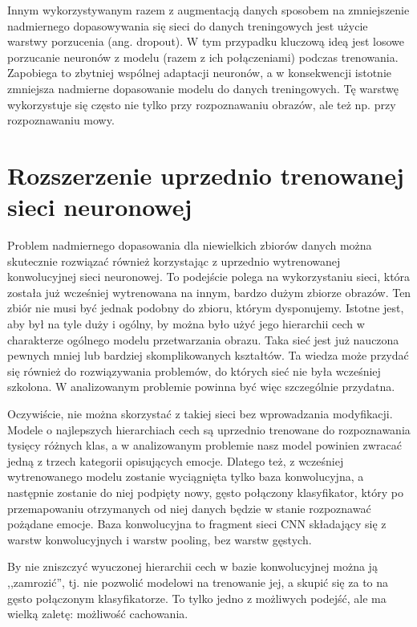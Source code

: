 Innym wykorzystywanym razem z augmentacją danych sposobem na zmniejszenie nadmiernego dopasowywania się sieci do danych treningowych jest użycie warstwy porzucenia (ang. dropout). W tym przypadku kluczową ideą jest losowe porzucanie neuronów z modelu (razem z ich połączeniami) podczas trenowania. Zapobiega to zbytniej wspólnej adaptacji neuronów, a w konsekwencji istotnie zmniejsza nadmierne dopasowanie modelu do danych treningowych. Tę warstwę wykorzystuje się często nie tylko przy rozpoznawaniu obrazów, ale też np. przy rozpoznawaniu mowy.


\section{Rozszerzenie uprzednio trenowanej sieci neuronowej}
Problem nadmiernego dopasowania dla niewielkich zbiorów danych można skutecznie rozwiązać również korzystając z uprzednio wytrenowanej konwolucyjnej sieci neuronowej. To podejście polega na wykorzystaniu sieci, która została już wcześniej wytrenowana na innym, bardzo dużym zbiorze obrazów. Ten zbiór nie musi być jednak podobny do zbioru, którym dysponujemy. Istotne jest, aby był na tyle duży i ogólny, by można było użyć jego hierarchii cech w charakterze ogólnego modelu przetwarzania obrazu. Taka sieć jest już nauczona pewnych mniej lub bardziej skomplikowanych kształtów. Ta wiedza może przydać się również do rozwiązywania problemów, do których sieć nie była wcześniej szkolona. W analizowanym problemie powinna być więc szczególnie przydatna.

Oczywiście, nie można skorzystać z takiej sieci bez wprowadzania modyfikacji. Modele o najlepszych hierarchiach cech są uprzednio trenowane do rozpoznawania tysięcy różnych klas, a w analizowanym problemie nasz model powinien zwracać jedną z trzech kategorii opisujących emocje. Dlatego też, z wcześniej wytrenowanego modelu zostanie wyciągnięta tylko baza konwolucyjna, a następnie zostanie do niej podpięty nowy, gęsto połączony klasyfikator, który po przemapowaniu otrzymanych od niej danych będzie w stanie rozpoznawać pożądane emocje. Baza konwolucyjna to fragment sieci CNN składający się z warstw konwolucyjnych i warstw pooling, bez warstw gęstych.

By nie zniszczyć wyuczonej hierarchii cech w bazie konwolucyjnej można ją ,,zamrozić'', tj. nie pozwolić modelowi na trenowanie jej, a skupić się za to na gęsto połączonym klasyfikatorze. To tylko jedno z możliwych podejść, ale ma wielką zaletę: możliwość cachowania.

